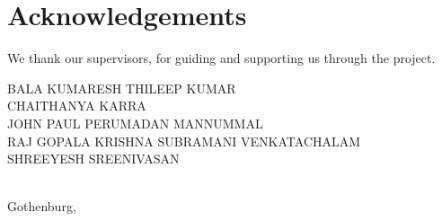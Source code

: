 \thispagestyle{plain}			%
\section*{Acknowledgements}
We thank our supervisors, for guiding and supporting us through the project.

\vspace{1.5cm}

{BALA KUMARESH THILEEP KUMAR}\\
\hfill{CHAITHANYA KARRA}\\
\hfill{JOHN PAUL PERUMADAN MANNUMMAL}\\
\hfill{RAJ GOPALA KRISHNA SUBRAMANI VENKATACHALAM}\\
\hfill{SHREEYESH SREENIVASAN}
\\\


{Gothenburg, \monthname \space \the\year}

\newpage				%
\thispagestyle{empty}
\mbox{}